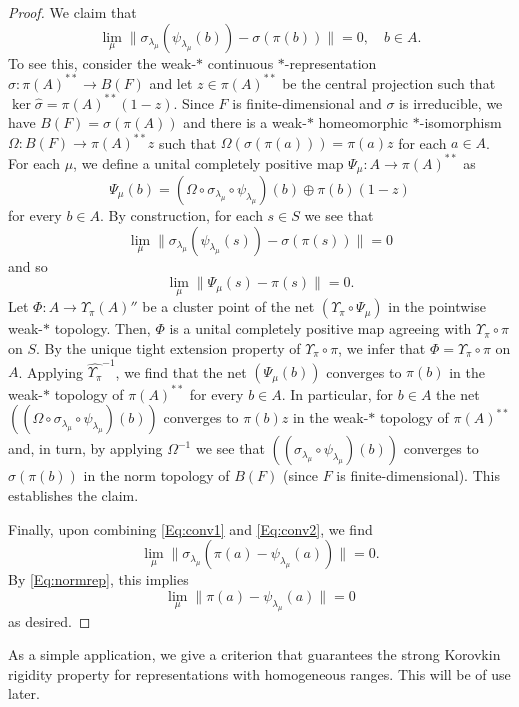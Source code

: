 \documentclass[10pt]{amsart}
\theoremstyle{definition}
\begin{document}
\begin{proof}
We claim that 
\begin{equation}\label{Eq:conv2}
\lim_\mu \|\sigma_{\lambda_\mu}(\psi_{\lambda_\mu}(b))-\sigma(\pi(b))\|=0, \quad b\in A.
\end{equation}
To see this, consider the weak-$*$ continuous $*$-representation $\widehat\sigma:\pi(A)^{**}\to B(F)$ and let $z\in \pi(A)^{**}$ be the central projection such that $\ker \widehat\sigma=\pi(A)^{**}(1-z)$. Since $F$ is finite-dimensional and $\sigma$ is irreducible, we have $B(F)=\sigma(\pi(A))$ and there is a weak-$*$ homeomorphic $*$-isomorphism $\Omega:B(F)\to \pi(A)^{**}z$ such that $\Omega(\sigma(\pi(a)))=\pi(a)z$ for each $a\in A$.  For each $\mu$, we define a unital completely positive map $\Psi_\mu:A\to \pi(A)^{**}$ as
\[
\Psi_\mu(b)=(\Omega\circ \sigma_{\lambda_\mu} \circ \psi_{\lambda_\mu})(b)\oplus \pi(b)(1-z)
\]
for every $b\in A$. By construction, for each $s\in S$ we see that
\[
\lim_\mu \|\sigma_{\lambda_\mu}(\psi_{\lambda_\mu}(s))-\sigma(\pi(s))\|=0
\]
and so
\[
\lim_\mu \|\Psi_\mu(s)-\pi(s)\|=0.
\]
Let $\Phi:A\to \Upsilon_\pi(A)''$ be a cluster point of the net $(\Upsilon_\pi\circ \Psi_\mu)$ in the pointwise weak-$*$ topology. Then, $\Phi$ is a unital completely positive map agreeing with $\Upsilon_\pi\circ \pi$ on $S$. By the unique tight extension property of $\Upsilon_\pi\circ \pi$, we infer that $\Phi=\Upsilon_\pi\circ \pi$ on $A$. Applying $\widehat{\Upsilon_\pi}^{-1}$, we find that the net $(\Psi_\mu(b))$ converges to $\pi(b)$ in the weak-$*$ topology of $\pi(A)^{**}$ for every $b\in A$. In particular,  for $b\in A$ the net $((\Omega\circ \sigma_{\lambda_\mu} \circ \psi_{\lambda_\mu})(b))$ converges to $\pi(b)z$  in the weak-$*$ topology of $\pi(A)^{**}$ and, in turn, by applying $\Omega^{-1}$ we see that $((\sigma_{\lambda_\mu} \circ \psi_{\lambda_\mu})(b))$ converges to $\sigma(\pi(b))$  in the norm topology of $B(F)$ (since $F$ is finite-dimensional). This establishes the claim.

Finally, upon combining \eqref{Eq:conv1} and \eqref{Eq:conv2}, we find 
\[
\lim_\mu \|\sigma_{\lambda_\mu}(\pi(a)-\psi_{\lambda_\mu}(a))\|=0.
\]
By \eqref{Eq:normrep}, this implies 
\[
\lim_\mu \|\pi(a)-\psi_{\lambda_\mu}(a)\|=0
\]
as desired.

\end{proof}


As a simple application, we give a criterion that guarantees the strong Korovkin rigidity property for representations with homogeneous ranges. This will be of use later.
 
\end{document}
